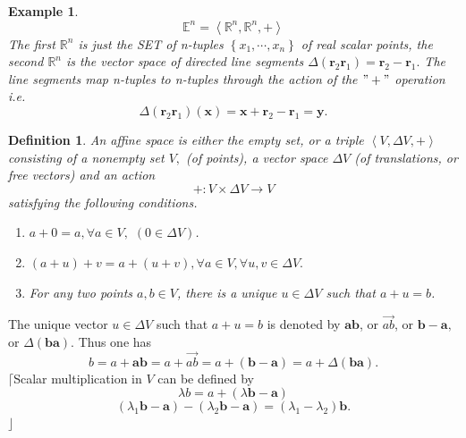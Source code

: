 \documentclass[aps,preprint]{revtex4}%
\newtheorem{definition}[theorem]{Definition}
\newtheorem{example}[theorem]{Example}
\begin{document}
\begin{example}%
\begin{equation}
\mathbb{E}^{n}=\left\langle \mathbb{R}^{n},\mathbb{R}^{n},+\right\rangle
\end{equation}
The first $\mathbb{R}^{n}$ is just the \emph{SET} of n-tuples $\left\{
x_{1},\cdots,x_{n}\right\}  $ of real scalar points, the second $\mathbb{R}%
^{n}$ is the \emph{vector space} of directed line segments $\Delta\left(
\mathbf{r}_{2}\mathbf{r}_{1}\right)  =\mathbf{r}_{2}-\mathbf{r}_{1}.$ The line
segments map n-tuples to n-tuples through the action of the $"+"$ operation
i.e.
\begin{equation}
\Delta\left(  \mathbf{r}_{2}\mathbf{r}_{1}\right)  \left(  \mathbf{x}\right)
=\mathbf{x+r}_{2}-\mathbf{r}_{1}=\mathbf{y.}%
\end{equation}

\end{example}

\begin{definition}
An \emph{affine space} is either the empty set, or a triple $\left\langle
V,\Delta V,+\right\rangle $ consisting of a nonempty set $V,$ (of points), a
vector space $\Delta V$ (of translations, or free vectors) and an action%
\begin{equation}
+:V\times\Delta V\rightarrow V
\end{equation}
satisfying the following conditions.

\begin{enumerate}
\item $a+0=a,\forall a\in V,$ $(0\in\Delta V)$.

\item $(a+u)+v=a+(u+v),\forall a\in V,\forall u,v\in\Delta V.$

\item For any two points $a,b\in V$, there is a unique $u\in\Delta V$ such
that $a+u=b$.
\end{enumerate}
\end{definition}

The unique vector $u\in\Delta V$ such that $a+u=b$ is denoted by $\mathbf{ab}%
$, or $\overrightarrow{ab}$, or $\mathbf{b-a,}$ or $\Delta\left(
\mathbf{ba}\right)  $. Thus one has%
\begin{equation}
b=a+\mathbf{ab}=a+\overrightarrow{ab}=a+\left(  \mathbf{b-a}\right)
=a+\Delta\left(  \mathbf{ba}\right)  .
\end{equation}
$\lceil$Scalar multiplication in $V$ can be defined by
\begin{equation}
\lambda b=a+\left(  \lambda\mathbf{b-a}\right)
\end{equation}%
\begin{equation}
\left(  \lambda_{1}\mathbf{b-a}\right)  -\left(  \lambda_{2}\mathbf{b-a}%
\right)  =\left(  \lambda_{1}-\lambda_{2}\right)  \mathbf{b.}%
\end{equation}
$\rfloor$
\end{document}
